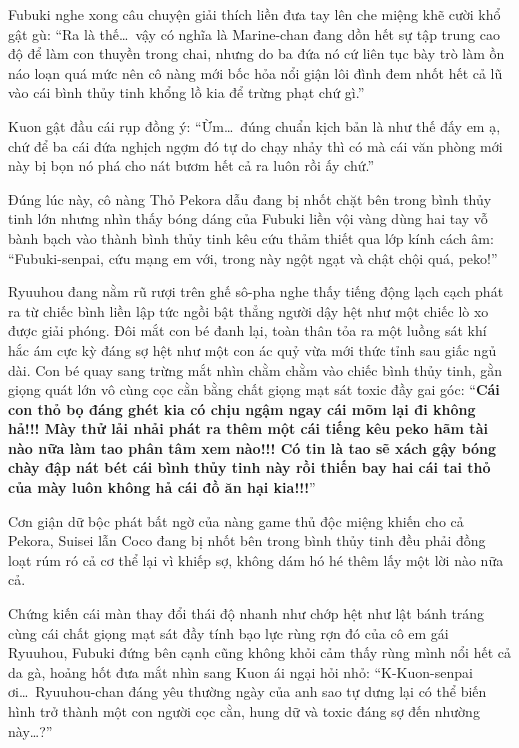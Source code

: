 \documentclass[../main.tex]{subfiles}
\begin{document}
Fubuki nghe xong câu chuyện giải thích liền đưa tay lên che miệng khẽ cười khổ gật gù: ``Ra là thế\dots\ vậy có nghĩa là Marine-chan đang dồn hết sự tập trung cao độ để làm con thuyền trong chai, nhưng do ba đứa nó cứ liên tục bày trò làm ồn náo loạn quá mức nên cô nàng mới bốc hỏa nổi giận lôi đình đem nhốt hết cả lũ vào cái bình thủy tinh khổng lồ kia để trừng phạt chứ gì.''

Kuon gật đầu cái rụp đồng ý: ``Ừm\dots\ đúng chuẩn kịch bản là như thế đấy em ạ, chứ để ba cái đứa nghịch ngợm đó tự do chạy nhảy thì có mà cái văn phòng mới này bị bọn nó phá cho nát bươm hết cả ra luôn rồi ấy chứ.''

Đúng lúc này, cô nàng Thỏ Pekora dẫu đang bị nhốt chặt bên trong bình thủy tinh lớn nhưng nhìn thấy bóng dáng của Fubuki liền vội vàng dùng hai tay vỗ bành bạch vào thành bình thủy tinh kêu cứu thảm thiết qua lớp kính cách âm: ``Fubuki-senpai, cứu mạng em với, trong này ngột ngạt và chật chội quá, peko!''

Ryuuhou đang nằm rũ rượi trên ghế sô-pha nghe thấy tiếng động lạch cạch phát ra từ chiếc bình liền lập tức ngồi bật thẳng người dậy hệt như một chiếc lò xo được giải phóng. Đôi mắt con bé đanh lại, toàn thân tỏa ra một luồng sát khí hắc ám cực kỳ đáng sợ hệt như một con ác quỷ vừa mới thức tỉnh sau giấc ngủ dài. Con bé quay sang trừng mắt nhìn chằm chằm vào chiếc bình thủy tinh, gằn giọng quát lớn vô cùng cọc cằn bằng chất giọng mạt sát toxic đầy gai góc: ``\textbf{Cái con thỏ bọ đáng ghét kia có chịu ngậm ngay cái mõm lại đi không hả!!! Mày thử lải nhải phát ra thêm một cái tiếng kêu peko hãm tài nào nữa làm tao phân tâm xem nào!!! Có tin là tao sẽ xách gậy bóng chày đập nát bét cái bình thủy tinh này rồi thiến bay hai cái tai thỏ của mày luôn không hả cái đồ ăn hại kia!!!}''

Cơn giận dữ bộc phát bất ngờ của nàng game thủ độc miệng khiến cho cả Pekora, Suisei lẫn Coco đang bị nhốt bên trong bình thủy tinh đều phải đồng loạt rúm ró cả cơ thể lại vì khiếp sợ, không dám hó hé thêm lấy một lời nào nữa cả.

Chứng kiến cái màn thay đổi thái độ nhanh như chớp hệt như lật bánh tráng cùng cái chất giọng mạt sát đầy tính bạo lực rùng rợn đó của cô em gái Ryuuhou, Fubuki đứng bên cạnh cũng không khỏi cảm thấy rùng mình nổi hết cả da gà, hoảng hốt đưa mắt nhìn sang Kuon ái ngại hỏi nhỏ: ``K-Kuon-senpai ơi\dots\ Ryuuhou-chan đáng yêu thường ngày của anh sao tự dưng lại có thể biến hình trở thành một con người cọc cằn, hung dữ và toxic đáng sợ đến nhường này\dots?''
\end{document}
